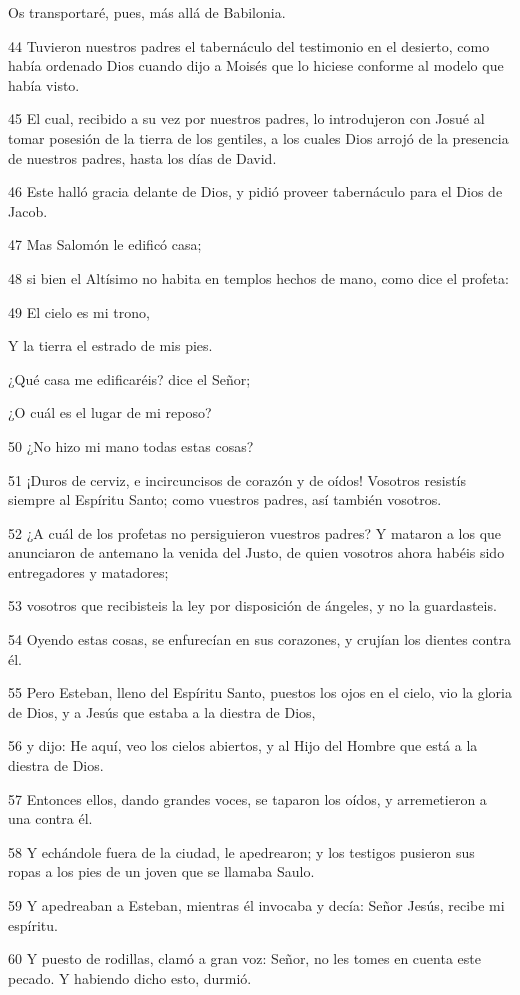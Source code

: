 \par Os transportaré, pues, más allá de Babilonia.
\par 44 Tuvieron nuestros padres el tabernáculo del testimonio en el desierto, como había ordenado Dios cuando dijo a Moisés que lo hiciese conforme al modelo que había visto.
\par 45 El cual, recibido a su vez por nuestros padres, lo introdujeron con Josué al tomar posesión de la tierra de los gentiles, a los cuales Dios arrojó de la presencia de nuestros padres, hasta los días de David.
\par 46 Este halló gracia delante de Dios, y pidió proveer tabernáculo para el Dios de Jacob.
\par 47 Mas Salomón le edificó casa;
\par 48 si bien el Altísimo no habita en templos hechos de mano, como dice el profeta:
\par 49 El cielo es mi trono,
\par Y la tierra el estrado de mis pies.
\par ¿Qué casa me edificaréis? dice el Señor;
\par ¿O cuál es el lugar de mi reposo?
\par 50 ¿No hizo mi mano todas estas cosas?
\par 51 ¡Duros de cerviz, e incircuncisos de corazón y de oídos! Vosotros resistís siempre al Espíritu Santo; como vuestros padres, así también vosotros.
\par 52 ¿A cuál de los profetas no persiguieron vuestros padres? Y mataron a los que anunciaron de antemano la venida del Justo, de quien vosotros ahora habéis sido entregadores y matadores;
\par 53 vosotros que recibisteis la ley por disposición de ángeles, y no la guardasteis.
\par 54 Oyendo estas cosas, se enfurecían en sus corazones, y crujían los dientes contra él.
\par 55 Pero Esteban, lleno del Espíritu Santo, puestos los ojos en el cielo, vio la gloria de Dios, y a Jesús que estaba a la diestra de Dios,
\par 56 y dijo: He aquí, veo los cielos abiertos, y al Hijo del Hombre que está a la diestra de Dios.
\par 57 Entonces ellos, dando grandes voces, se taparon los oídos, y arremetieron a una contra él.
\par 58 Y echándole fuera de la ciudad, le apedrearon; y los testigos pusieron sus ropas a los pies de un joven que se llamaba Saulo.
\par 59 Y apedreaban a Esteban, mientras él invocaba y decía: Señor Jesús, recibe mi espíritu.
\par 60 Y puesto de rodillas, clamó a gran voz: Señor, no les tomes en cuenta este pecado. Y habiendo dicho esto, durmió.

